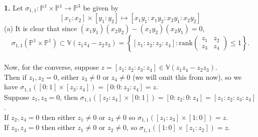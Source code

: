 \documentclass[a4paper]{article}
\begin{document}
    \textbf{1.} Let
    $\sigma_{1,1}  \colon \mathbb{P}^{1} \times \mathbb{P}^{1} \to
    \mathbb{P}^3$ be given by
    \[
    \left[ x_1 : x_2 \right] \times \left[ y_1 : y_2 \right] 
    \mapsto \left[ x_1 y_1 : x_1 y_2 : x_2 y_1 : x_2 y_2 \right] 
    \]  
    (a) It is clear that since
    $(x_1 y_1) (x_2 y_2) - (x_1 y_2) (x_2 y_1) = 0$, 
    $$\sigma_{1,1}\left( \mathbb{P}^{1} \times \mathbb{P}^{1} \right) 
    \subset \mathbb{V} \left( z_1 z_4 - z_2 z_3 \right) 
    = 
    \left\{ \left[ z_1 : z_2 : z_3 : z_4 \right] 
     \colon \text{rank}
 \begin{pmatrix} z_1 & z_2 \\ z_3 & z_4 \end{pmatrix} 
\le 1 \right\}. $$\\
\linebreak
Now, for the converse, suppose 
$z = \left[ z_1 : z_2 : z_3 : z_4 \right] \in 
\mathbb{V} \left( z_1 z_4 - z_2 z_3 \right) $.\\
\linebreak
Then
if $z_1, z_2 = 0$, either $z_3 \neq 0$ or $z_4\neq 0$ (we will omit this from
now), so we have
$\sigma_{1,1}\left( 
\left[ 0 : 1 \right] \times  \left[ z_3 : z_4 \right] \right) 
= \left[ 0 : 0 : z_3 : z_4 \right] =z$.\\
\linebreak
Suppose $z_1, z_3 = 0$, then
$\sigma_{1,1}\left( 
\left[ z_2 : z_4 \right] \times  \left[ 0:1 \right] \right) 
= \left[ 0 : z_2 : 0 : z_4 \right] 
= \left[ z_1 : z_2 : z_3 : z_4 \right] $.\\
\linebreak
If $z_2 , z_4 = 0$ then either $z_1 \neq 0$ or $z_3 \neq 0$ so
$\sigma_{1,1}\left( 
\left[ z_1 : z_3 \right] \times \left[ 1 : 0 \right] \right) = z$.\\
\linebreak
If $z_3, z_4 = 0$ then either $z_1 \neq 0$ or $z_2 \neq 0$, so 
$\sigma_{1,1}\left( 
\left[ 1 : 0 \right]\times \left[ z_1:z_2 \right]  \right) = z$.\\
\linebreak
\end{document}
